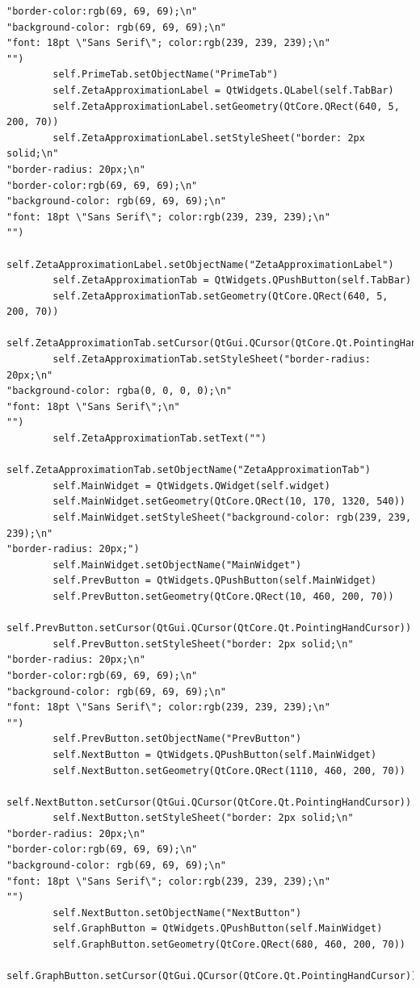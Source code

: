 \documentclass[12pt]{article}
\begin{document}
\begin{lstlisting}
"border-color:rgb(69, 69, 69);\n"
"background-color: rgb(69, 69, 69);\n"
"font: 18pt \"Sans Serif\"; color:rgb(239, 239, 239);\n"
"")
        self.PrimeTab.setObjectName("PrimeTab")
        self.ZetaApproximationLabel = QtWidgets.QLabel(self.TabBar)
        self.ZetaApproximationLabel.setGeometry(QtCore.QRect(640, 5, 200, 70))
        self.ZetaApproximationLabel.setStyleSheet("border: 2px solid;\n"
"border-radius: 20px;\n"
"border-color:rgb(69, 69, 69);\n"
"background-color: rgb(69, 69, 69);\n"
"font: 18pt \"Sans Serif\"; color:rgb(239, 239, 239);\n"
"")
        self.ZetaApproximationLabel.setObjectName("ZetaApproximationLabel")
        self.ZetaApproximationTab = QtWidgets.QPushButton(self.TabBar)
        self.ZetaApproximationTab.setGeometry(QtCore.QRect(640, 5, 200, 70))
        self.ZetaApproximationTab.setCursor(QtGui.QCursor(QtCore.Qt.PointingHandCursor))
        self.ZetaApproximationTab.setStyleSheet("border-radius: 20px;\n"
"background-color: rgba(0, 0, 0, 0);\n"
"font: 18pt \"Sans Serif\";\n"
"")
        self.ZetaApproximationTab.setText("")
        self.ZetaApproximationTab.setObjectName("ZetaApproximationTab")
        self.MainWidget = QtWidgets.QWidget(self.widget)
        self.MainWidget.setGeometry(QtCore.QRect(10, 170, 1320, 540))
        self.MainWidget.setStyleSheet("background-color: rgb(239, 239, 239);\n"
"border-radius: 20px;")
        self.MainWidget.setObjectName("MainWidget")
        self.PrevButton = QtWidgets.QPushButton(self.MainWidget)
        self.PrevButton.setGeometry(QtCore.QRect(10, 460, 200, 70))
        self.PrevButton.setCursor(QtGui.QCursor(QtCore.Qt.PointingHandCursor))
        self.PrevButton.setStyleSheet("border: 2px solid;\n"
"border-radius: 20px;\n"
"border-color:rgb(69, 69, 69);\n"
"background-color: rgb(69, 69, 69);\n"
"font: 18pt \"Sans Serif\"; color:rgb(239, 239, 239);\n"
"")
        self.PrevButton.setObjectName("PrevButton")
        self.NextButton = QtWidgets.QPushButton(self.MainWidget)
        self.NextButton.setGeometry(QtCore.QRect(1110, 460, 200, 70))
        self.NextButton.setCursor(QtGui.QCursor(QtCore.Qt.PointingHandCursor))
        self.NextButton.setStyleSheet("border: 2px solid;\n"
"border-radius: 20px;\n"
"border-color:rgb(69, 69, 69);\n"
"background-color: rgb(69, 69, 69);\n"
"font: 18pt \"Sans Serif\"; color:rgb(239, 239, 239);\n"
"")
        self.NextButton.setObjectName("NextButton")
        self.GraphButton = QtWidgets.QPushButton(self.MainWidget)
        self.GraphButton.setGeometry(QtCore.QRect(680, 460, 200, 70))
        self.GraphButton.setCursor(QtGui.QCursor(QtCore.Qt.PointingHandCursor))

\end{lstlisting}
\end{document}
